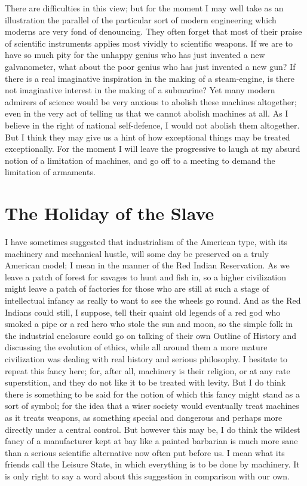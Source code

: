 \documentclass{book}
\begin{document}
There are difficulties in this view; but for the moment I may well take as an illustration the parallel of the particular sort of modern engineering which moderns are very fond of denouncing. They often forget that most of their praise of scientific instruments applies most vividly to scientific weapons. If we are to have so much pity for the unhappy genius who has just invented a new galvanometer, what about the poor genius who has just invented a new gun? If there is a real imaginative inspiration in the making of a steam-engine, is there not imaginative interest in the making of a submarine? Yet many modern admirers of science would be very anxious to abolish these machines altogether; even in the very act of telling us that we cannot abolish machines at all. As I believe in the right of national self-defence, I would not abolish them altogether. But I think they may give us a hint of how exceptional things may be treated exceptionally. For the moment I will leave the progressive to laugh at my absurd notion of a limitation of machines, and go off to a meeting to demand the limitation of armaments.

\chapter{The Holiday of the Slave}
\label{chapter-17}
I have sometimes suggested that industrialism of the American type, with its machinery and mechanical hustle, will some day be preserved on a truly American model; I mean in the manner of the Red Indian Reservation. As we leave a patch of forest for savages to hunt and fish in, so a higher civilization might leave a patch of factories for those who are still at such a stage of intellectual infancy as really to want to see the wheels go round. And as the Red Indians could still, I suppose, tell their quaint old legends of a red god who smoked a pipe or a red hero who stole the sun and moon, so the simple folk in the industrial enclosure could go on talking of their own Outline of History and discussing the evolution of ethics, while all around them a more mature civilization was dealing with real history and serious philosophy. I hesitate to repeat this fancy here; for, after all, machinery is their religion, or at any rate superstition, and they do not like it to be treated with levity. But I do think there is something to be said for the notion of which this fancy might stand as a sort of symbol; for the idea that a wiser society would eventually treat machines as it treats weapons, as something special and dangerous and perhaps more directly under a central control. But however this may be, I do think the wildest fancy of a manufacturer kept at bay like a painted barbarian is much more sane than a serious scientific alternative now often put before us. I mean what its friends call the Leisure State, in which everything is to be done by machinery. It is only right to say a word about this suggestion in comparison with our own.
\end{document}
